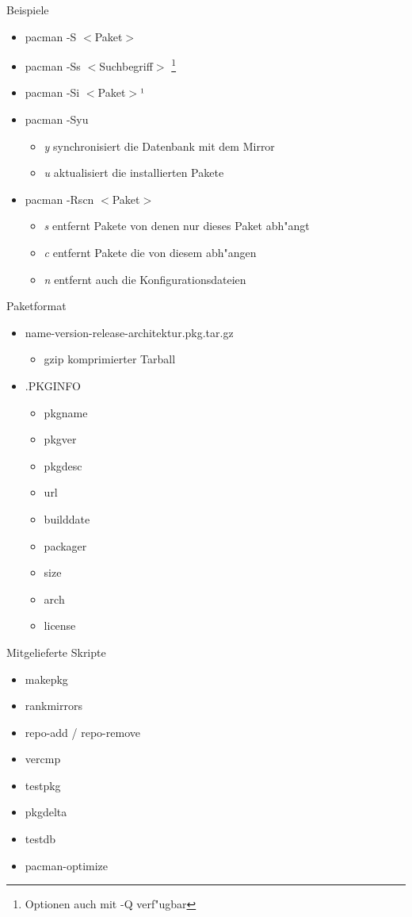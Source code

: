 \begin{slide}{Beispiele}
	\begin{itemize}
		\item{pacman -S $<$Paket$>$}
		\item{pacman -Ss $<$Suchbegriff$>$
			\footnote{Optionen auch mit -Q verf"{u}gbar}
		}
		\item{pacman -Si $<$Paket$>$¹}
		\item{pacman -Syu
			\begin{itemize}
				\item{\textit{y} synchronisiert die Datenbank mit dem Mirror}
				\item{\textit{u} aktualisiert die installierten Pakete}
			\end{itemize}
		}
		\item{pacman -Rscn $<$Paket$>$
			\begin{itemize}
				\item{\textit{s} entfernt Pakete von denen nur dieses Paket
					abh"{a}ngt}
				\item{\textit{c} entfernt Pakete die von diesem abh"{a}ngen}
				\item{\textit{n} entfernt auch die Konfigurationsdateien}
			\end{itemize}
		}
	\end{itemize}
\end{slide}

\begin{slide}{Paketformat}
	\begin{itemize}
		\item{name-version-release-architektur.pkg.tar.gz
			\begin{itemize}
				\item{gzip komprimierter Tarball}
			\end{itemize}
		}
		\item{.PKGINFO
			\begin{itemize}
				\item{pkgname}
				\item{pkgver}
				\item{pkgdesc}
				\item{url}
				\item{builddate}
				\item{packager}
				\item{size}
				\item{arch}
				\item{license}
			\end{itemize}
		}		
	\end{itemize}
\end{slide}

\begin{slide}{Mitgelieferte Skripte}
		\begin{itemize}
			\item{makepkg}
			\item{rankmirrors}
			\item{repo-add / repo-remove}
			\item{vercmp}
			\item{testpkg}
			\item{pkgdelta}
			\item{testdb}
			\item{pacman-optimize}
		\end{itemize}
\end{slide}

